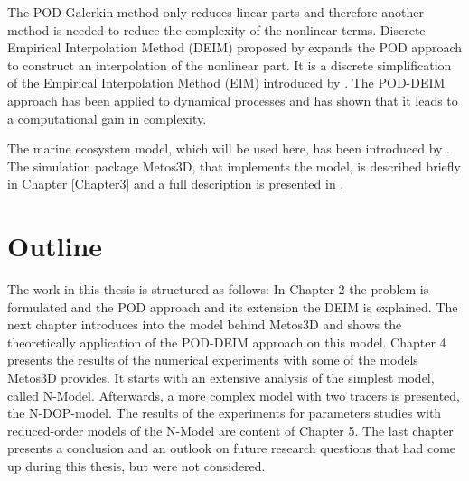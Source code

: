 The POD-Galerkin method only reduces linear parts and therefore another method is needed to reduce the complexity of the nonlinear terms.
Discrete Empirical Interpolation Method (DEIM) proposed by \cite{Chaturantabut2010Deim,PHDCha} expands the POD approach to construct
an interpolation of the nonlinear part. It is a discrete simplification of the Empirical Interpolation Method
(EIM) introduced by \cite{EIM}. The POD-DEIM approach has been applied to dynamical processes \cite{PODDeimapplication,PODDeimshallowwater,PODdeimpredetor,Xiao20141} and has
shown that it leads to a computational gain in complexity. 

The marine ecosystem model, which will be used here, has been introduced by \cite{metosidea}. The simulation
package Metos3D, that implements the model, is described briefly in Chapter \ref{Chapter3} and a full description is presented in \cite{metos3dsimpack}. 

\section{Outline} 
The work in this thesis is structured as follows: 
In Chapter 2 the problem is formulated and the POD approach and its extension the DEIM is explained. The next chapter 
introduces into the model behind Metos3D and shows the theoretically application of the POD-DEIM approach on this model.
Chapter 4 presents the results of the numerical experiments with some of the models Metos3D provides. It starts with an 
extensive analysis of the simplest model, called N-Model. Afterwards, a more complex model with two tracers is presented, 
the N-DOP-model. The results of the experiments for parameters studies with reduced-order models of the N-Model are content of 
Chapter 5.
The last chapter presents a conclusion and an outlook on future research questions that had come up
during this thesis, but were not considered.







